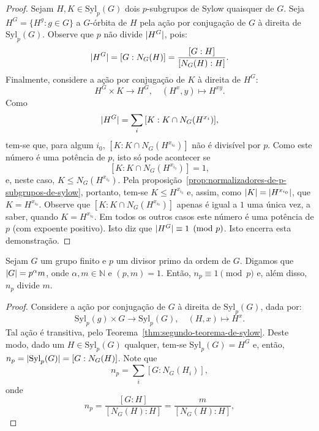 \begin{proof}
  Sejam $H,K\in\text{Syl}_{p}(G)$ dois $p$-subgrupos de Sylow quaisquer de $G$. Seja $H^{G}=\{H^{g}:g\in{G}\}$ a $G$-órbita de $H$ pela ação por conjugação de $G$ à direita de $\text{Syl}_{p}(G)$. Observe que $p$ não divide $\lvert H^{G}\rvert$, pois:
  \[
    \lvert H^{G}\rvert=[G:N_{G}(H)]=\frac{[G:H]}{[N_{G}(H):H]}.
  \]
  Finalmente, considere a ação por conjugação de $K$ à direita de $H^{G}$:
  \[
    H^{G}\times{K}\to{H^{G}},\quad{(H^{x},y)\mapsto{H^{xy}}}.
  \]
  Como
  \[
    \lvert H^{G}\rvert=\sum_{i}\,[K:K\cap{N_{G}(H^{x_{i}})}],
  \]
  tem-se que, para algum $i_{0}$, $[K:K\cap{N_{G}(H^{x_{i_{0}}})}]$ não é divisível por $p$. Como este número é uma potência de $p$, isto só pode acontecer se
  \[
    [K:K\cap{N_{G}(H^{x_{i_{0}}})}]=1,
  \]
  e, neste caso, $K\leqslant{N_{G}(H^{x_{i_{0}}})}$. Pela proposição~\ref{prop:normalizadores-de-p-subgrupos-de-sylow}, portanto, tem-se $K\leqslant{H^{x_{i_{0}}}}$ e, assim, como $\lvert K\rvert=\lvert H^{x_{i_{0}}}\rvert$, que $K=H^{x_{i_{0}}}$. Observe que $[K:K\cap{N_{G}(H^{x_{i_{0}}})}]$ apenas é igual a $1$ uma única vez, a saber, quando $K=H^{x_{i_{0}}}$. Em todos os outros casos este número é uma potência de $p$ (com expoente positivo). Isto diz que $\lvert H^{G}\rvert\equiv{1}\pmod{p}$. Isto encerra esta demonstração.
\end{proof}

\begin{theorem}[Sylow]\label{thm:terceiro-teorema-de-sylow}
  Sejam $G$ um grupo finito e $p$ um divisor primo da ordem de $G$. Digamos que $\lvert G\rvert=p^{\alpha}m$, onde $\alpha,m\in{\mathbb{N}}$ e $(p,m)=1$. Então, $n_{p}\equiv{1}\pmod{p}$ e, além disso, $n_{p}$ divide $m$.
\end{theorem}

\begin{proof}
  Considere a ação por conjugação de $G$ à direita de $\text{Syl}_{p}(G)$, dada por:
  \[
    \text{Syl}_{p}(g)\times{G}\to\text{Syl}_{p}(G),\quad{(H,x)\mapsto{H^{x}}}.
  \]
  Tal ação é transitiva, pelo Teorema~\ref{thm:segundo-teorema-de-sylow}. Deste modo, dado um $H\in\text{Syl}_{p}(G)$ qualquer, tem-se $\text{Syl}_{p}(G)=H^{G}$ e, então, $n_{p}=\lvert\text{Syl}_{p}(G)\rvert=[G:N_{G}(H)]$.
  Note que
  \[
    n_{p}=\sum_{i}[G:N_{G}(H_{i})],
  \]
  onde
  \[
    n_{p}
    =
    \frac{[G:H]}{[N_{G}(H):H]}
    =
    \frac{m}{[N_{G}(H):H]},
  \]
\end{proof}
